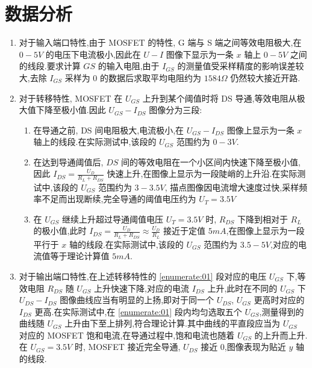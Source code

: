     \section{数据分析}
        \begin{enumerate}
            \item 对于输入端口特性,由于 MOSFET 的特性, G 端与 S 端之间等效电阻极大,在 $0-5V$ 的电压下电流极小,因此在 $U-I$ 图像下显示为一条 $x$ 轴上 $0-5V$ 之间的线段.要求计算 $GS$ 的输入电阻,由于 $I_{GS}$ 的测量值受采样精度的影响误差较大,去除 $I_{GS}$ 采样为 0 的数据后求取平均电阻约为 $1584\Omega$ 仍然较大接近开路.
            \item 对于转移特性, MOSFET 在 $U_{GS}$ 上升到某个阈值时将 DS 导通,等效电阻从极大值下降至极小值.因此 $U_{GS}-I_{DS}$ 图像分为三段:
                \begin{enumerate}
                    \item 在导通之前, DS 间电阻极大,电流极小,在 $U_{GS}-I_{DS}$ 图像上显示为一条 $x$ 轴上的线段.在实际测试中,该段的 $U_{GS}$ 范围约为 $0-3V$.
                    \item\label{enumerate:01} 在达到导通阈值后, $DS$ 间的等效电阻在一个小区间内快速下降至极小值,因此 $I_{DS}=\frac{U_{D}}{R_{L}+R_{DS}}$ 快速上升,在图像上显示为一段陡峭的上升沿.在实际测试中,该段的 $U_{GS}$ 范围约为 $3-3.5V$, 描点图像因电流增大速度过快,采样频率不足而出现断续,完全导通的阈值电压约为 $U_{T}=3.5V$
                    \item 在 $U_{GS}$ 继续上升超过导通阈值电压 $U_{T}=3.5V$ 时, $R_{DS}$ 下降到相对于 $R_{L}$ 的极小值,此时 $I_{DS}=\frac{U_{D}}{R_{L}+R_{DS}}\approx \frac{U_{D}}{R_{L}}$ 接近于定值 $5mA$,在图像上显示为一段平行于 $x$ 轴的线段.在实际测试中,该段的 $U_{GS}$ 范围约为 $3.5-5V$,对应的电流值等于理论计算值 $5mA$.
                \end{enumerate}
            \item 对于输出端口特性,在上述转移特性的 \ref{enumerate:01} 段对应的电压 $U_{GS}$ 下,等效电阻 $R_{DS}$ 随 $U_{GS}$ 上升快速下降,对应的电流 $I_{DS}$ 上升,此时在不同的 $U_{GS}$ 下 $U_{DS}-I_{DS}$ 图像曲线应当有明显的上扬,即对于同一个 $U_{DS}$, $U_{GS}$ 更高时对应的 $I_{DS}$ 更高.在实际测试中,在 \ref{enumerate:01} 段内均匀选取五个 $U_{GS}$,测量得到的曲线随 $U_{GS}$ 上升由下至上排列,符合理论计算.其中曲线的平直段应当为 $U_{GS}$ 对应的 MOSFET 饱和电流,在导通过程中,饱和电流也随着 $U_{GS}$ 的上升而上升.在 $U_{GS}=3.5V$ 时, MOSFET 接近完全导通, $U_{DS}$ 接近 0,图像表现为贴近 $y$ 轴的线段.
        \end{enumerate}
